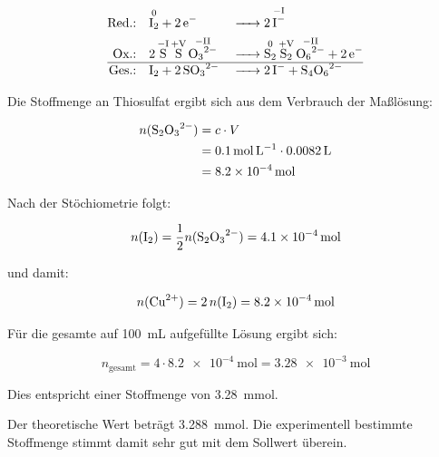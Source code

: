 \begin{align}
    \text{Red.:}\quad &
    \ce{\overset{\mathrm{0}}{\ce{I2}} + 2 e^-}
                      & \ce{->} &
    \ce{2 \overset{\mathrm{-I}}{\ce{I^-}}}                                                                         \\
    \text{Ox.:}\quad  &
    \ce{2 \overset{\mathrm{-I}}{\ce{S}} \overset{\mathrm{+V}}{\ce{S}} \overset{\mathrm{-II}}{\ce{O3^{2-}}}}
                      & \ce{->} &
    \ce{\overset{\mathrm{0}}{\ce{S2}} \overset{\mathrm{+V}}{\ce{S2}} \overset{\mathrm{-II}}{\ce{O6^{2-}}} + 2 e^-} \\
    \hline
    \text{Ges.:}\quad &
    \ce{I2 + 2 SO3^{2-}}
                      & \ce{->} &
    \ce{2 I^- + S4O6^{2-}}
\end{align}

Die Stoffmenge an Thiosulfat ergibt sich aus dem Verbrauch der Maßlösung:

\begin{equation}
    \begin{aligned}
        n(\ce{S2O3^{2-}}) & = c \cdot V                                           \\
                          & = \SI{0.1}{\mole\per\liter} \cdot \SI{0.0082}{\liter} \\
                          & = \SI{8.2e-4}{\mole}
    \end{aligned}
\end{equation}

Nach der Stöchiometrie folgt:

\begin{equation}
    n(\ce{I2}) = \frac{1}{2} n(\ce{S2O3^{2-}}) = \SI{4.1e-4}{\mole}
\end{equation}

und damit:

\begin{equation}
    n(\ce{Cu^{2+}}) = 2 \, n(\ce{I2}) = \SI{8.2e-4}{\mole}
\end{equation}

Für die gesamte auf \SI{100}{\milli\liter} aufgefüllte Lösung ergibt sich:

\begin{equation}
    n_{\text{gesamt}} = 4 \cdot \SI{8.2e-4}{\mole} = \SI{3.28e-3}{\mole}
\end{equation}

Dies entspricht einer Stoffmenge von \SI{3.28}{\milli\mole}.

Der theoretische Wert beträgt \SI{3.288}{\milli\mole}. Die experimentell bestimmte Stoffmenge stimmt damit sehr gut mit dem Sollwert überein. \newline


